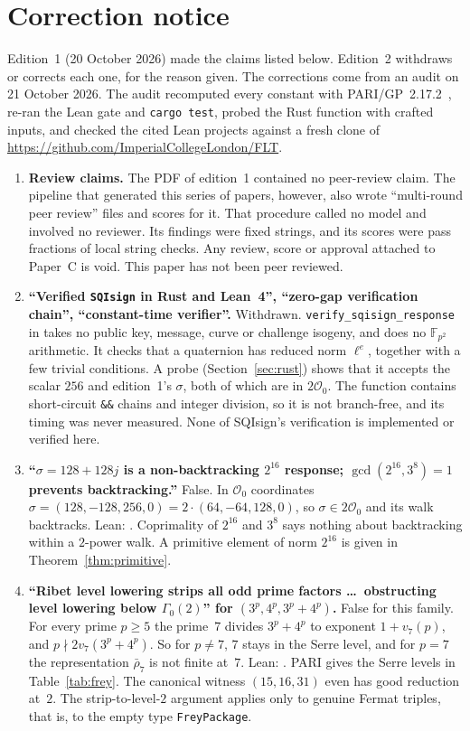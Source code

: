 \documentclass[11pt,a4paper]{article}
\theoremstyle{definition}
\newcommand{\Oz}{\mathcal{O}_0}
\newcommand{\lean}[1]{\path{#1}}
\begin{document}
\section*{Correction notice}
Edition~1 (20 October 2026) made the claims listed below. Edition~2 withdraws or corrects each one, for the reason given. The corrections come from an audit on 21 October 2026. The audit recomputed every constant with PARI/GP~2.17.2~\cite{PARI}, re-ran the Lean gate and \texttt{cargo test}, probed the Rust function with crafted inputs, and checked the cited Lean projects against a fresh clone of \url{https://github.com/ImperialCollegeLondon/FLT}.
\begin{enumerate}
  \item \textbf{Review claims.} The PDF of edition~1 contained no peer-review claim. The pipeline that generated this series of papers, however, also wrote ``multi-round peer review'' files and scores for it. That procedure called no model and involved no reviewer. Its findings were fixed strings, and its scores were pass fractions of local string checks. Any review, score or approval attached to Paper~C is void. This paper has not been peer reviewed.
  \item \textbf{``Verified \texttt{SQIsign} in Rust and Lean~4'', ``zero-gap verification chain'', ``constant-time verifier''.} Withdrawn. \texttt{verify\_sqisign\_response} in  takes no public key, message, curve or challenge isogeny, and does no $\mathbb F_{p^2}$ arithmetic. It checks that a quaternion has reduced norm $\ell^e$, together with a few trivial conditions. A probe (Section~\ref{sec:rust}) shows that it accepts the scalar $256$ and edition~1's $\sigma$, both of which are in $2\Oz$. The function contains short-circuit \texttt{\&\&} chains and integer division, so it is not branch-free, and its timing was never measured. None of SQIsign's verification is implemented or verified here.
  \item \textbf{``$\sigma=128+128j$ is a non-backtracking $2^{16}$ response; $\gcd(2^{16},3^8)=1$ prevents backtracking.''} False. In $\Oz$ coordinates $\sigma=(128,-128,256,0)=2\cdot(64,-64,128,0)$, so $\sigma\in2\Oz$ and its walk backtracks. Lean: \lean{paper_sigma_in_two_O0}. Coprimality of $2^{16}$ and $3^8$ says nothing about backtracking within a $2$-power walk. A primitive element of norm $2^{16}$ is given in Theorem~\ref{thm:primitive}.
  \item \textbf{``Ribet level lowering strips all odd prime factors \dots\ obstructing level lowering below $\Gamma_0(2)$'' for $(3^p,4^p,3^p+4^p)$.} False for this family. For every prime $p\ge5$ the prime~$7$ divides $3^p+4^p$ to exponent $1+v_7(p)$, and $p\nmid 2v_7(3^p+4^p)$. So for $p\neq7$, $7$ stays in the Serre level, and for $p=7$ the representation $\bar\rho_7$ is not finite at~$7$. Lean: \lean{seven_survives_serre_level}. PARI gives the Serre levels in Table~\ref{tab:frey}. The canonical witness $(15,16,31)$ even has good reduction at~$2$. The strip-to-level-$2$ argument applies only to genuine Fermat triples, that is, to the empty type \texttt{FreyPackage}.

\end{enumerate}
\end{document}
